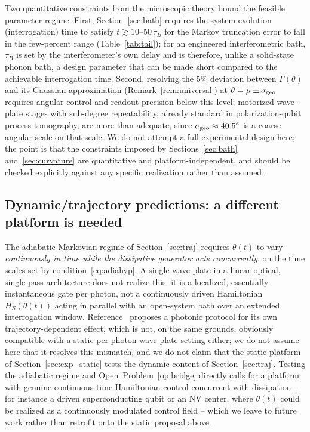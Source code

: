 \documentclass[aps,pra,reprint,superscriptaddress,nofootinbib,longbibliography]{revtex4-2}
\begin{document}
Two quantitative constraints from the microscopic theory bound the
feasible parameter regime. First, Section~\ref{sec:bath} requires the
system evolution (interrogation) time to satisfy $t\gtrsim10$--$50\,\tau_B$
for the Markov truncation error to fall in the few-percent range
(Table~\ref{tab:tail}); for an engineered interferometric bath, $\tau_B$
is set by the interferometer's own delay and is therefore, unlike a
solid-state phonon bath, a design parameter that can be made short
compared to the achievable interrogation time. Second, resolving the
$5\%$ deviation between $\Gamma(\theta)$ and its Gaussian approximation
(Remark~\ref{rem:universal}) at $\theta=\mu\pm\sigma_{\rm geo}$ requires
angular control and readout precision below this level; motorized
wave-plate stages with sub-degree repeatability, already standard in
polarization-qubit process tomography, are more than adequate, since
$\sigma_{\rm geo}\approx40.5^\circ$ is a coarse angular scale on that
scale. We do not attempt a full experimental design here; the point is
that the constraints imposed by Sections~\ref{sec:bath}
and~\ref{sec:curvature} are quantitative and platform-independent, and
should be checked explicitly against any specific realization rather
than assumed.

\subsection{Dynamic/trajectory predictions: a different platform is needed}
\label{sec:exp_dynamic}

The adiabatic-Markovian regime of Section~\ref{sec:traj} requires
$\theta(t)$ to vary \emph{continuously in time while the dissipative
generator acts concurrently}, on the time scales set by
condition~\eqref{eq:adiahyp}. A single wave plate in a linear-optical,
single-pass architecture does not realize this: it is a localized,
essentially instantaneous gate per photon, not a continuously driven
Hamiltonian $H_S(\theta(t))$ acting in parallel with an open-system
bath over an extended interrogation window. Reference~\cite{rodrigues2025}
proposes a photonic protocol for its own trajectory-dependent effect,
which is not, on the same grounds, obviously compatible with a static
per-photon wave-plate setting either; we do not assume here that it
resolves this mismatch, and we do not claim that the static platform
of Section~\ref{sec:exp_static} tests the dynamic content of
Section~\ref{sec:traj}. Testing the adiabatic regime and
Open~Problem~\ref{op:bridge} directly calls for a platform with
genuine continuous-time Hamiltonian control concurrent with
dissipation -- for instance a driven superconducting qubit or an NV
center, where $\theta(t)$ could be realized as a continuously
modulated control field -- which we leave to future work rather than
retrofit onto the static proposal above.
\end{document}
